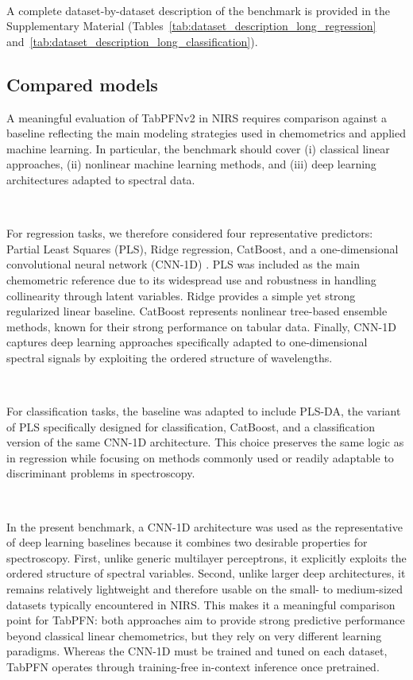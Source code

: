\documentclass{article}
\begin{document}
~

A complete dataset-by-dataset description of the benchmark is provided in the Supplementary Material (Tables~\ref{tab:dataset_description_long_regression} and~\ref{tab:dataset_description_long_classification}).



\FloatBarrier

\subsection{Compared models}

A meaningful evaluation of TabPFNv2 in NIRS requires comparison against a baseline reflecting the main modeling strategies used in chemometrics and applied machine learning. In particular, the benchmark should cover (i) classical linear approaches, (ii) nonlinear machine learning methods, and (iii) deep learning architectures adapted to spectral data.

~

For regression tasks, we therefore considered four representative predictors: Partial Least Squares (PLS), Ridge regression, CatBoost, and a one-dimensional convolutional neural network (CNN-1D) \cite{nicon_yam}. PLS was included as the main chemometric reference due to its widespread use and robustness in handling collinearity through latent variables. Ridge provides a simple yet strong regularized linear baseline. CatBoost represents nonlinear tree-based ensemble methods, known for their strong performance on tabular data. Finally, CNN-1D captures deep learning approaches specifically adapted to one-dimensional spectral signals by exploiting the ordered structure of wavelengths.

~

For classification tasks, the baseline was adapted to include PLS-DA, the variant of PLS specifically designed for classification, CatBoost, and a classification version of the same CNN-1D architecture. This choice preserves the same logic as in regression while focusing on methods commonly used or readily adaptable to discriminant problems in spectroscopy.

~

In the present benchmark, a CNN-1D architecture was used as the representative of deep learning baselines because it combines two desirable properties for spectroscopy. First, unlike generic multilayer perceptrons, it explicitly exploits the ordered structure of spectral variables. Second, unlike larger deep architectures, it remains relatively lightweight and therefore usable on the small- to medium-sized datasets typically encountered in NIRS. This makes it a meaningful comparison point for TabPFN: both approaches aim to provide strong predictive performance beyond classical linear chemometrics, but they rely on very different learning paradigms. Whereas the CNN-1D must be trained and tuned on each dataset, TabPFN operates through training-free in-context inference once pretrained.
\end{document}

